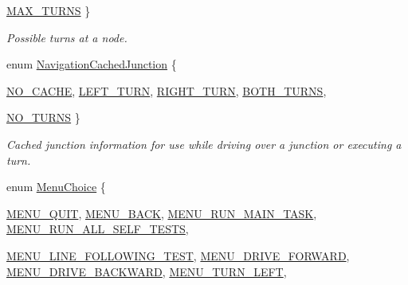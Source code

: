\begin{DoxyCompactItemize}
\par
\hyperlink{namespaceIDP_ab8b8e9ff9f7de27da30c1fffaeef4b72a46fc0b6ab4752131480e4a05b09e1280}{MAX\_\-TURNS}
 \}
\begin{DoxyCompactList}\small\item\em Possible turns at a node. \item\end{DoxyCompactList}\item 
enum \hyperlink{namespaceIDP_a628dde0214c4c861deda405e77ad75a2}{NavigationCachedJunction} \{ \par
\hyperlink{namespaceIDP_a628dde0214c4c861deda405e77ad75a2a35431162cfca423a194c5680b2f56b4e}{NO\_\-CACHE}, 
\hyperlink{namespaceIDP_a628dde0214c4c861deda405e77ad75a2a145fe4dd7949a83a0dec44b73c2ec852}{LEFT\_\-TURN}, 
\hyperlink{namespaceIDP_a628dde0214c4c861deda405e77ad75a2a93bc5c5f7716052e0a1ae894ce62c0ea}{RIGHT\_\-TURN}, 
\hyperlink{namespaceIDP_a628dde0214c4c861deda405e77ad75a2a261d3686e8d0ca300956b91c987889db}{BOTH\_\-TURNS}, 
\par
\hyperlink{namespaceIDP_a628dde0214c4c861deda405e77ad75a2a0a75c4d06bf2d5a2b4d1c37cede78ddd}{NO\_\-TURNS}
 \}
\begin{DoxyCompactList}\small\item\em Cached junction information for use while driving over a junction or executing a turn. \item\end{DoxyCompactList}\item 
enum \hyperlink{namespaceIDP_ac1d3c3b62448912be4da9f2728f2af99}{MenuChoice} \{ \par
\hyperlink{namespaceIDP_ac1d3c3b62448912be4da9f2728f2af99a59187814038f8d9935b623e0d8b343d8}{MENU\_\-QUIT}, 
\hyperlink{namespaceIDP_ac1d3c3b62448912be4da9f2728f2af99a47d4f5eed03ea0b44b8623c8f69670d2}{MENU\_\-BACK}, 
\hyperlink{namespaceIDP_ac1d3c3b62448912be4da9f2728f2af99ab6a8ae6d050d587d31cbe4d0bf960f14}{MENU\_\-RUN\_\-MAIN\_\-TASK}, 
\hyperlink{namespaceIDP_ac1d3c3b62448912be4da9f2728f2af99adda52b9f226e94ccf52c9adc477dab37}{MENU\_\-RUN\_\-ALL\_\-SELF\_\-TESTS}, 
\par
\hyperlink{namespaceIDP_ac1d3c3b62448912be4da9f2728f2af99a1aa3dace9f087c1336551f4beda7492e}{MENU\_\-LINE\_\-FOLLOWING\_\-TEST}, 
\hyperlink{namespaceIDP_ac1d3c3b62448912be4da9f2728f2af99a9df5e55c1ef501f357d859392c72e630}{MENU\_\-DRIVE\_\-FORWARD}, 
\hyperlink{namespaceIDP_ac1d3c3b62448912be4da9f2728f2af99abc427a1c6b01c8735c08b7400ec27428}{MENU\_\-DRIVE\_\-BACKWARD}, 
\hyperlink{namespaceIDP_ac1d3c3b62448912be4da9f2728f2af99a0b9c5176d49d3809e80cd23d00c9a801}{MENU\_\-TURN\_\-LEFT}, 

\end{DoxyCompactItemize}
